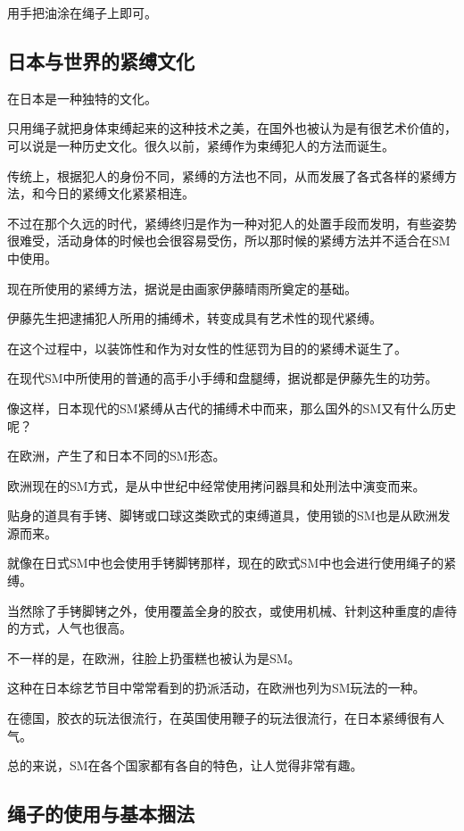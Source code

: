 \documentclass[12pt,UTF8]{ctexbook}
\begin{document}
用手把油涂在绳子上即可。

\subsection{日本与世界的紧缚文化}

在日本是一种独特的文化。

只用绳子就把身体束缚起来的这种技术之美，在国外也被认为是有很艺术价值的，可以说是一种历史文化。很久以前，紧缚作为束缚犯人的方法而诞生。

传统上，根据犯人的身份不同，紧缚的方法也不同，从而发展了各式各样的紧缚方法，和今日的紧缚文化紧紧相连。

不过在那个久远的时代，紧缚终归是作为一种对犯人的处置手段而发明，有些姿势很难受，活动身体的时候也会很容易受伤，所以那时候的紧缚方法并不适合在SM中使用。

现在所使用的紧缚方法，据说是由画家伊藤晴雨所奠定的基础。

伊藤先生把逮捕犯人所用的捕缚术，转变成具有艺术性的现代紧缚。

在这个过程中，以装饰性和作为对女性的性惩罚为目的的紧缚术诞生了。

在现代SM中所使用的普通的高手小手缚和盘腿缚，据说都是伊藤先生的功劳。

像这样，日本现代的SM紧缚从古代的捕缚术中而来，那么国外的SM又有什么历史呢？

在欧洲，产生了和日本不同的SM形态。

欧洲现在的SM方式，是从中世纪中经常使用拷问器具和处刑法中演变而来。

贴身的道具有手铐、脚铐或口球这类欧式的束缚道具，使用锁的SM也是从欧洲发源而来。

就像在日式SM中也会使用手铐脚铐那样，现在的欧式SM中也会进行使用绳子的紧缚。

当然除了手铐脚铐之外，使用覆盖全身的胶衣，或使用机械、针刺这种重度的虐待的方式，人气也很高。

不一样的是，在欧洲，往脸上扔蛋糕也被认为是SM。

这种在日本综艺节目中常常看到的扔派活动，在欧洲也列为SM玩法的一种。

在德国，胶衣的玩法很流行，在英国使用鞭子的玩法很流行，在日本紧缚很有人气。

总的来说，SM在各个国家都有各自的特色，让人觉得非常有趣。

\subsection{绳子的使用与基本捆法}
\end{document}
